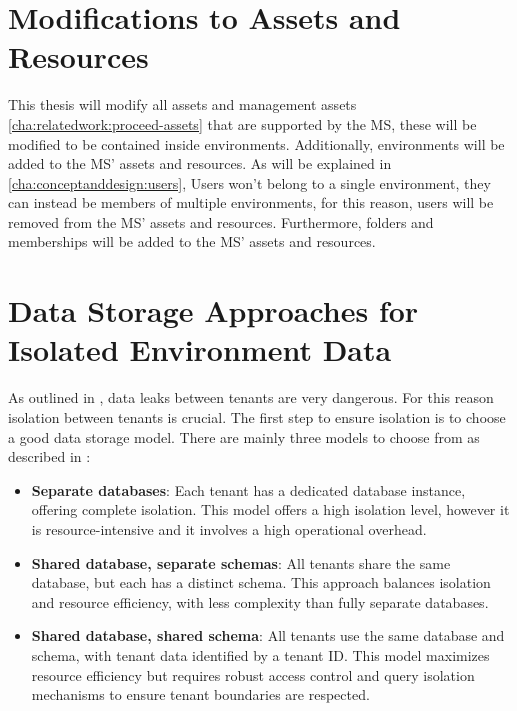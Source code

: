 \section{Modifications to Assets and Resources}

This thesis will modify all assets and management assets \ref{cha:relatedwork:proceed-assets}
that are supported by the MS,
these will be modified to be contained inside environments.
Additionally, environments will be added to the MS' assets and resources.
As will be explained in \ref{cha:conceptanddesign:users}, Users won't belong to a single
environment, they can instead be members of multiple environments, for this reason,
users will be removed from the MS' assets and resources.
Furthermore, folders and  memberships will be added to the MS' assets and
resources.

\section{Data Storage Approaches for Isolated Environment Data}

As outlined in \cite[3.3]{multi-tenant-dream-or-nightmare},
data leaks between tenants are very dangerous.
For this reason isolation between tenants is crucial.
The first step to ensure isolation is to choose a good data storage model.
There are mainly three models to choose from as described in
\cite[4.1]{Pushpan2024MultiTenantArchitecture}:

\begin{itemize}
  \item \textbf{Separate databases}: Each tenant has a dedicated database instance,
    offering complete isolation.
    This model offers a high isolation level,
    however it is resource-intensive and it involves a high operational overhead.

  \item \textbf{Shared database, separate schemas}: All tenants share the same database, but each has a distinct schema. 
      This approach balances isolation and resource efficiency, with less complexity than fully separate databases.

  \item \textbf{Shared database, shared schema}: All tenants use the same database and schema, with tenant data identified by a tenant ID. This model maximizes resource efficiency but requires robust access control and query isolation mechanisms to ensure tenant boundaries are respected.
\end{itemize}

